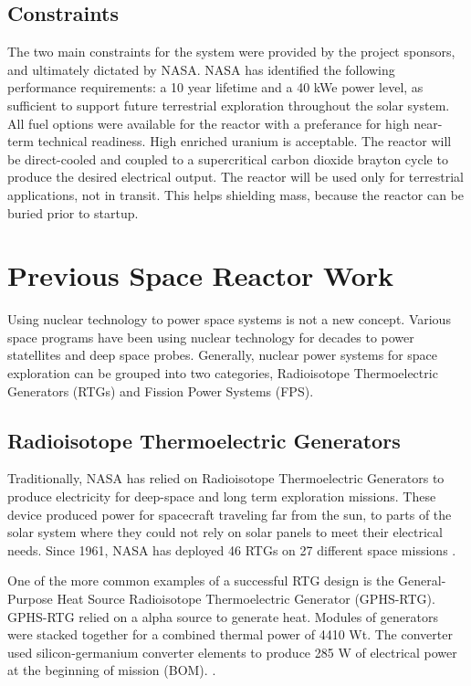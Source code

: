 \subsection{Constraints}
The two main constraints for the system were provided by the project sponsors,
and ultimately dictated by NASA. NASA has identified the following performance
requirements: a 10 year lifetime and a 40 kWe power level, as sufficient to
support future terrestrial exploration throughout the solar system. All fuel
options were available for the reactor with a preferance for high near-term
technical readiness. High enriched uranium is acceptable. The reactor will be direct-cooled and coupled to a
supercritical carbon dioxide brayton cycle to produce the desired electrical
output. The reactor will be used only for terrestrial applications, not in
transit. This helps shielding mass, because the reactor can be buried prior to
startup.

\section{Previous Space Reactor Work}
Using nuclear technology to power space systems is not a new concept. Various
space programs have been using nuclear technology for decades to power
statellites and deep space probes. Generally, nuclear power systems for space
exploration can be grouped into two categories, Radioisotope Thermoelectric
Generators (RTGs) and Fission Power Systems (FPS). 

\subsection{Radioisotope Thermoelectric Generators}
Traditionally, NASA has relied on Radioisotope Thermoelectric Generators to
produce electricity for deep-space and long term exploration missions. These
device produced power for spacecraft traveling far from the sun, to parts of the
solar system where they could not rely on solar panels to meet their electrical
needs. Since 1961, NASA has deployed 46 RTGs on 27 different space missions
\citep{mmrtg_fact}.

One of the more common examples of a successful RTG design is the
General-Purpose Heat Source Radioisotope Thermoelectric Generator (GPHS-RTG).
GPHS-RTG relied on a \pu alpha source to generate heat. Modules of \pu
generators were stacked together for a combined thermal power of 4410 Wt. The
converter used silicon-germanium converter elements to produce 285 W of
electrical power at the beginning of mission (BOM).
\citep{bennett_mission_2006}. 

